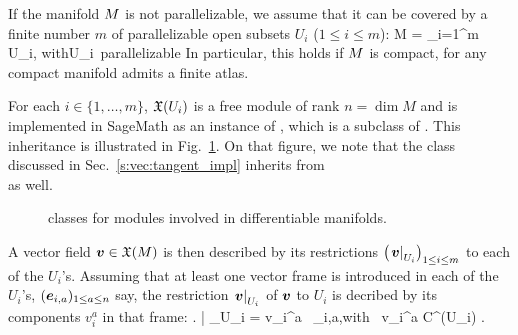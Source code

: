 If the manifold $M$ is not parallelizable,
we assume that it can be covered by a finite number $m$
of parallelizable open subsets $U_i$ ($1\leq i \leq m$):
\be
    M = \bigcup_{i=1}^m U_i, \qquad\mbox{with}\quad U_i\ \mbox{parallelizable}
\ee
In particular, this holds if $M$ is compact, for any compact
manifold admits a finite atlas.

For each $i\in\{1,\ldots,m\}$, $\mathfrak{X}(U_i)$ is a free module of rank $n=\dim  M$ and is implemented in SageMath as an instance of
, which is a subclass of
. This inheritance is illustrated in
Fig.~\ref{f:vec:module_classes}. On that figure, we note that the class
 discussed in Sec.~\ref{s:vec:tangent_impl} inherits from\\
 as well.

\begin{figure}
\begin{center}

\end{center}
\caption{\label{f:vec:module_classes} \footnotesize
\Sage{} classes for modules involved in differentiable manifolds.}
\end{figure}


A vector field $\bm{v}\in\mathfrak{X}(M)$ is then described by its
restrictions $\left(\left. \bm{v}\right| _{U_i}\right)_{1\leq i \leq m}$ to each of the $U_i$'s.
Assuming that at least one vector frame is introduced in each of the $U_i$'s,
$(\bm{e}_{i,a})_{1\leq a \leq n}$ say, the restriction $\left. \bm{v}\right| _{U_i}$ of
$\bm{v}$ to $U_i$ is decribed by its components $v_i^a$ in that frame:
\be \label{e:vec:vi_expand}
    \left. \right| _{U_i} = v_i^a \, _{i,a},\quad\mbox{with\ } v_i^a \in C^\infty(U_i) .
\ee

